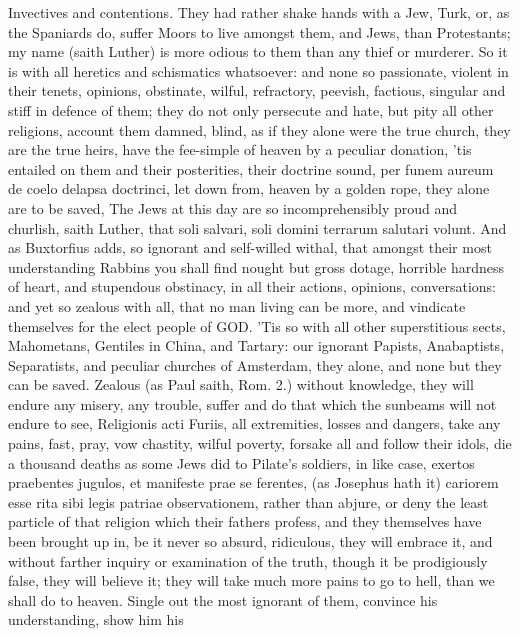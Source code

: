 {Invectives and contentions. They had rather shake hands with a Jew,
Turk, or, as the Spaniards do, suffer Moors to live amongst them, and
Jews, than Protestants; my name (saith Luther) is more odious to
them than any thief or murderer. So it is with all heretics and
schismatics whatsoever: and none so passionate, violent in their
tenets, opinions, obstinate, wilful, refractory, peevish, factious,
singular and stiff in defence of them; they do not only persecute and
hate, but pity all other religions, account them damned, blind, as if
they alone were the true church, they are the true heirs, have the
fee-simple of heaven by a peculiar donation, 'tis entailed on them and
their posterities, their doctrine sound, per funem aureum de coelo
delapsa doctrinci, let down from, heaven by a golden rope, they alone
are to be saved, The Jews at this day are so incomprehensibly proud and
churlish, saith Luther, that soli salvari, soli domini terrarum
salutari volunt. And as Buxtorfius adds, so ignorant and
self-willed withal, that amongst their most understanding Rabbins you
shall find nought but gross dotage, horrible hardness of heart, and
stupendous obstinacy, in all their actions, opinions, conversations:
and yet so zealous with all, that no man living can be more, and
vindicate themselves for the elect people of \textsc{GOD}. 'Tis so with all
other superstitious sects, Mahometans, Gentiles in China, and Tartary:
our ignorant Papists, Anabaptists, Separatists, and peculiar churches
of Amsterdam, they alone, and none but they can be saved. Zealous
(as Paul saith, Rom.  2.) without knowledge, they will endure any
misery, any trouble, suffer and do that which the sunbeams will not
endure to see, Religionis acti Furiis, all extremities, losses and
dangers, take any pains, fast, pray, vow chastity, wilful poverty,
forsake all and follow their idols, die a thousand deaths as some Jews
did to Pilate's soldiers, in like case, exertos praebentes jugulos, et
manifeste prae se ferentes, (as Josephus hath it) cariorem esse rita
sibi legis patriae observationem, rather than abjure, or deny the least
particle of that religion which their fathers profess, and they
themselves have been brought up in, be it never so absurd, ridiculous,
they will embrace it, and without farther inquiry or examination of the
truth, though it be prodigiously false, they will believe it; they will
take much more pains to go to hell, than we shall do to heaven. Single
out the most ignorant of them, convince his understanding, show him his
}
